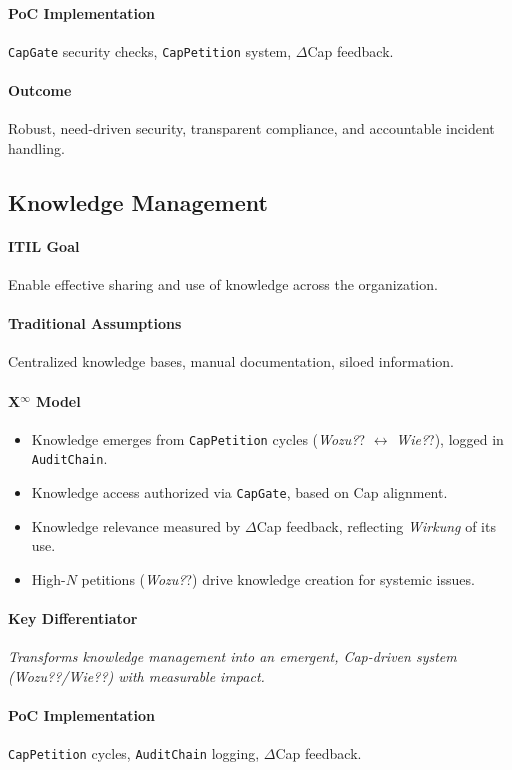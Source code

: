\documentclass[12pt, a4paper]{scrartcl}
\newcommand{\Xinf}{X$^\infty$}                        %
\newcommand{\DeltaCap}{$\Delta$Cap}                    %
\newcommand{\Wirkung}{\textit{Wirkung}}                 %
\newcommand{\CapGate}{\texttt{CapGate}}
\newcommand{\AuditChain}{\texttt{AuditChain}}
\newcommand{\CapPetition}{\texttt{CapPetition}}        %
\newcommand{\Wozu}{\textit{Wozu?}}                      %
\newcommand{\Wie}{\textit{Wie?}}                        %
\begin{document}
\paragraph{PoC Implementation} \CapGate{} security checks, \CapPetition{} system, \DeltaCap{} feedback.
\paragraph{Outcome} Robust, need-driven security, transparent compliance, and accountable incident handling.

\subsection{Knowledge Management} %
\paragraph{ITIL Goal} Enable effective sharing and use of knowledge across the organization.
\paragraph{Traditional Assumptions} Centralized knowledge bases, manual documentation, siloed information.
\paragraph*{\Xinf{} Model}
\begin{itemize}
    \item Knowledge emerges from \CapPetition{} cycles (\Wozu? $\leftrightarrow$ \Wie?), logged in \AuditChain{}. %
    \item Knowledge access authorized via \CapGate{}, based on Cap alignment.
    \item Knowledge relevance measured by \DeltaCap{} feedback, reflecting \Wirkung{} of its use.
    \item High-$N$ petitions (\Wozu?) drive knowledge creation for systemic issues.
\end{itemize}
\paragraph{Key Differentiator} \textit{Transforms knowledge management into an emergent, Cap-driven system (\Wozu?/\Wie?) with measurable impact.}
\paragraph{PoC Implementation} \CapPetition{} cycles, \AuditChain{} logging, \DeltaCap{} feedback.
\end{document}
